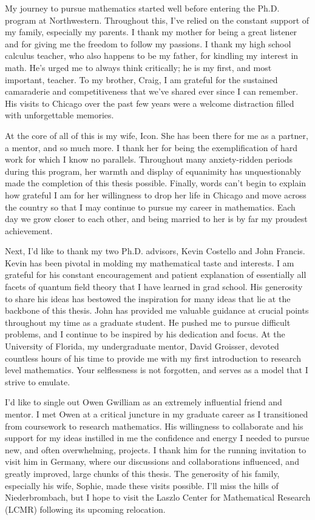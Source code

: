 My journey to pursue mathematics started well before entering the Ph.D. program at Northwestern.
Throughout this, I've relied on the constant support of my family, especially my parents. 
I thank my mother for being a great listener and for giving me the freedom to follow my passions. 
I thank my high school calculus teacher, who also happens to be my father, for kindling my interest in math.
He's urged me to always think critically; he is my first, and most important, teacher. 
To my brother, Craig, I am grateful for the sustained camaraderie and competitiveness that we've shared ever since I can remember. 
His visits to Chicago over the past few years were a welcome distraction filled with unforgettable memories.

At the core of all of this is my wife, Icon.
She has been there for me as a partner, a mentor, and so much more.
I thank her for being the exemplification of hard work for which I know no parallels. 
Throughout many anxiety-ridden periods during this program, her warmth and display of equanimity has unquestionably made the completion of this thesis possible.
Finally, words can't begin to explain how grateful I am for her willingness to drop her life in Chicago and move across the country so that I may continue to pursue my career in mathematics. 
Each day we grow closer to each other, and being married to her is by far my proudest achievement.

Next, I'd like to thank my two Ph.D. advisors, Kevin Costello and John Francis. 
Kevin has been pivotal in molding my mathematical taste and interests. 
I am grateful for his constant encouragement and patient explanation of essentially all facets of quantum field theory that I have learned in grad school.
His generosity to share his ideas has bestowed the inspiration for many ideas that lie at the backbone of this thesis.  
John has provided me valuable guidance at crucial points throughout my time as a graduate student.
He pushed me to pursue difficult problems, and I continue to be inspired by his dedication and focus. 
At the University of Florida, my undergraduate mentor, David Groisser, devoted countless hours of his time to provide me with my first introduction to research level mathematics. 
Your selflessness is not forgotten, and serves as a model that I strive to emulate. 

I'd like to single out Owen Gwilliam as an extremely influential friend and mentor.
I met Owen at a critical juncture in my graduate career as I transitioned from coursework to research mathematics. 
His willingness to collaborate and his support for my ideas instilled in me the confidence and energy I needed to pursue new, and often overwhelming, projects. 
I thank him for the running invitation to visit him in Germany, where our discussions and collaborations influenced, and greatly improved, large chunks of this thesis. 
The generosity of his family, especially his wife, Sophie, made these visits possible.
I'll miss the hills of Niederbrombach, but I hope to visit the Laszlo Center for Mathematical Research (LCMR) following its upcoming relocation.
 
